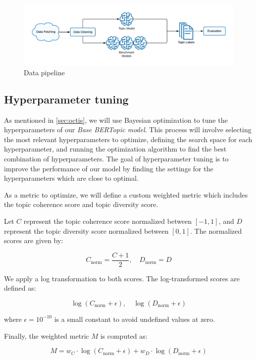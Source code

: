 \begin{figure}[h]
    \centering
    \includegraphics[width=\textwidth]{figures/data_pipeline.pdf}
    \caption{Data pipeline}
    \label{fig:data_pipeline}
\end{figure}

\subsection{Hyperparameter tuning}
\label{sec:hyperparameter_tuning}
As mentioned in \cref{sec:octis}, we will use Bayesian optimization to tune the hyperparameters of our \textit{Base BERTopic model}. This process will involve selecting the most relevant hyperparameters to optimize, defining the search space for each hyperparameter, and running the optimization algorithm to find the best combination of hyperparameters. The goal of hyperparameter tuning is to improve the performance of our model by finding the settings for the hyperparameters which are close to optimal.

As a metric to optimize, we will define a custom weighted metric which includes the topic coherence score and topic diversity score.

Let \( C \) represent the topic coherence score normalized between \([-1, 1]\), and \( D \) represent the topic diversity score normalized between \([0, 1]\). The normalized scores are given by:

\[
C_{\text{norm}} = \frac{C + 1}{2}, \quad D_{\text{norm}} = D
\]

We apply a log transformation to both scores. The log-transformed scores are defined as:

\[
\log(C_{\text{norm}} + \epsilon), \quad \log(D_{\text{norm}} + \epsilon)
\]

where \( \epsilon = 10^{-10} \) is a small constant to avoid undefined values at zero.

Finally, the weighted metric \( M \) is computed as:

\[
M = w_C \cdot \log(C_{\text{norm}} + \epsilon) + w_D \cdot \log(D_{\text{norm}} + \epsilon)
\]

